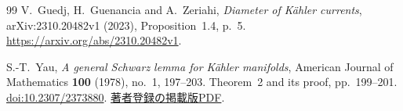 \begin{thebibliography}{99}
V.~Guedj, H.~Guenancia and A.~Zeriahi,
\emph{Diameter of K\"ahler currents},
arXiv:2310.20482v1 (2023), Proposition~1.4, p.~5.
\url{https://arxiv.org/abs/2310.20482v1}.

S.-T.~Yau,
\emph{A general Schwarz lemma for K\"ahler manifolds},
American Journal of Mathematics \textbf{100} (1978), no.~1, 197--203.
Theorem~2 and its proof, pp.~199--201.
\href{https://doi.org/10.2307/2373880}{doi:10.2307/2373880}.
\href{https://archive.ymsc.tsinghua.edu.cn/pacm_download/59/11034-Shing-Tung_Yau_30.pdf}{著者登録の掲載版PDF}.

\end{thebibliography}
